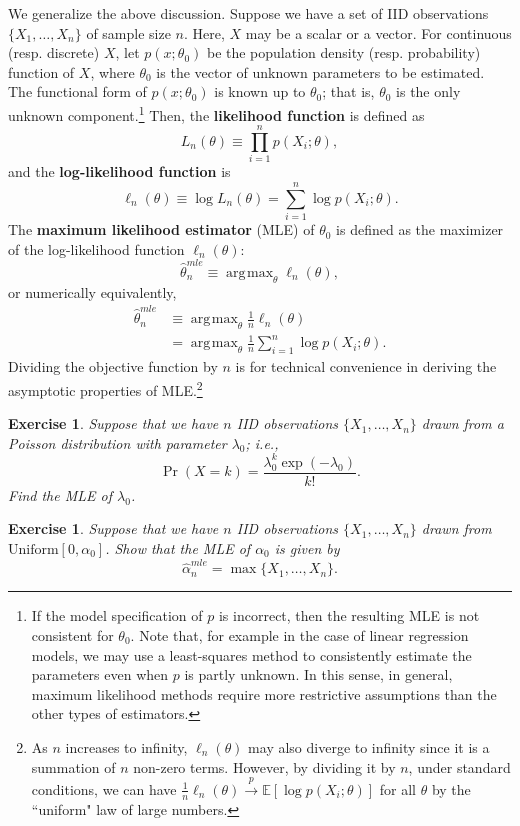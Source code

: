 \documentclass[10.5pt, A4paper, openany, uplatex]{book}
\newcommand{\E}{\mathbb{E}}
\renewcommand{\hat}{\widehat}
\newtheorem{exercise}[theorem]{Exercise}
\numberwithin{equation}{section}
\DeclareMathOperator*{\argmax}{\arg\!\max}
\begin{document}
We generalize the above discussion.
Suppose we have a set of IID observations $\{X_1, \ldots, X_n\}$ of sample size $n$.
Here, $X$ may be a scalar or a vector.
For continuous (resp. discrete) $X$, let $p(x ; \theta_0)$ be the population density (resp. probability) function of $X$, where $\theta_0$ is the vector of unknown parameters to be estimated.
The functional form of $p(x ; \theta_0)$ is known up to $\theta_0$; that is, $\theta_0$ is the only unknown component.\footnote{
	If the model specification of $p$ is incorrect, then the resulting MLE is not consistent for $\theta_0$.
	Note that, for example in the case of linear regression models, we may use a least-squares method to consistently estimate the parameters even when $p$ is partly unknown.
	In this sense, in general, maximum likelihood methods require more restrictive assumptions than the other types of estimators.
	}
Then, the \textbf{likelihood function} is defined as
\[
	L_n(\theta) \equiv \prod_{i = 1}^n p(X_i; \theta),
\]
and the \textbf{log-likelihood function} is
\[
	\ell_n(\theta) \equiv \log L_n(\theta) = \sum_{i = 1}^n \log p(X_i; \theta).
\]
The \textbf{maximum likelihood estimator} (MLE) of $\theta_0$ is defined as the maximizer of the log-likelihood function $\ell_n(\theta)$: 
\[
	\hat \theta_n^{mle} \equiv \argmax_{\theta}\ell_n(\theta),
\]
or numerically equivalently,
\begin{align*}
	\hat \theta_n^{mle} 
	& \equiv \argmax_{\theta} \frac{1}{n} \ell_n(\theta) \\ 
	& = \argmax_{\theta} \frac{1}{n} \sum_{i = 1}^n \log p(X_i; \theta).
\end{align*}
Dividing the objective function by $n$ is for technical convenience in deriving the asymptotic properties of MLE.\footnote{
	As $n$ increases to infinity, $\ell_n(\theta)$ may also diverge to infinity since it is a summation of $n$ non-zero terms.
	However, by dividing it by $n$, under standard conditions, we can have $\frac{1}{n} \ell_n(\theta) \overset{p}{\to} \E[\log p(X_i; \theta)]$ for all $\theta$ by the ``uniform" law of large numbers.\label{foot:UWLLN}
	}

\begin{framed}
\begin{exercise}\upshape
	Suppose that we have $n$ IID observations $\{X_1, \ldots, X_n\}$ drawn from a Poisson distribution with parameter $\lambda_0$; i.e.,
	\[
		\Pr(X = k) = \frac{\lambda_0^k \exp(-\lambda_0)}{k !}.
	\]
	Find the MLE of $\lambda_0$.
\end{exercise}
\begin{exercise}\label{ex:maxuni}\upshape
	Suppose that we have $n$ IID observations $\{X_1, \ldots, X_n\}$ drawn from $\text{Uniform}[0, \alpha_0]$.
	Show that the MLE of $\alpha_0$ is given by 
	\[
	\hat \alpha_n^{mle} = \max\{X_1, \ldots, X_n\}. 
	\] 
\end{exercise}
\end{framed}
\end{document}

